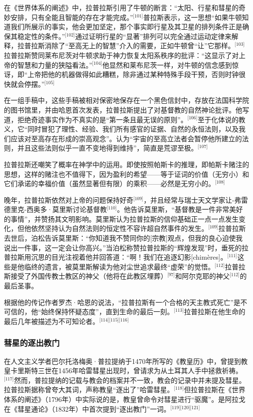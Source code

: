 在《世界体系的阐述》中，拉普拉斯引用了牛顿的断言：“太阳、行星和彗星的奇妙安排，只有全能且智能的存在才能完成。”\(^\text{[101]}\)普拉斯表示，这一思想“如果牛顿知道我们所展示的事实，他会更加坚定，那个事实即行星及其卫星的排列条件正是确保其稳定性的条件。”\(^\text{[102]}\)通过证明行星的“显著”排列可以完全通过运动定律来解释，拉普拉斯消除了“至高无上的智慧”介入的需要，正如牛顿曾“让”它那样。\(^\text{[103]}\)拉普拉斯赞同莱布尼茨对牛顿求助于神力恢复太阳系秩序的批评：“这显示了对上帝的智慧和力量的狭隘看法。”\(^\text{[104]}\)他显然和莱布尼茨一样，对牛顿的信念感到惊讶，即“上帝把他的机器做得如此糟糕，除非通过某种特殊手段干预，否则时钟很快就会停摆。”\(^\text{[105]}\)

在一组手稿中，这些手稿被相对保密地保存在一个黑色信封中，存放在法国科学院的图书馆里，并由哈恩首次发表，拉普拉斯提出了对基督教的自然神论批评。他写道，拒绝奇迹事实作为不真实的是“第一条且最无误的原则”。\(^\text{[106]}\)至于化体说的教义，它“同时冒犯了理性、经验、我们所有感官的证据、自然的永恒法则，以及我们应该对至高存在形成的崇高观念”。认为“宇宙的至高立法者会暂停他所建立的法则，并且这些法则似乎一直不变地得到维持”，简直是荒谬至极。\(^\text{[107]}\)

拉普拉斯还嘲笑了概率在神学中的运用。即使按照帕斯卡的推理，即帕斯卡赌注的思想，这样的赌注也不值得下，因为盈利的希望——等于证词的价值（无穷小）和它们承诺的幸福价值（虽然显著但有限）的乘积——必然是无穷小的。\(^\text{[108]}\)

晚年，拉普拉斯依然对上帝的问题保持好奇\(^\text{[109]}\)，并且经常与瑞士天文学家让-弗雷德里克-西奥多·莫里斯讨论基督教\(^\text{[110]}\)。他告诉莫里斯，“基督教是一件非常美好的事情”，并赞扬其文明影响。莫里斯认为拉普拉斯的信仰基础正一点一点发生变化，但他依然坚持认为自然法则的恒定性不容许超自然事件的发生。\(^\text{[109]}\)拉普拉斯去世后，泊松告诉莫里斯：“你知道我不赞同你的[宗教]观点，但我的良心迫使我说出一件事，这一定会让你高兴。”当泊松称赞拉普拉斯的“辉煌发现”时，垂死的拉普拉斯用沉思的目光注视着他并回答道：“啊！我们在追逐幻影[chimères]。\(^\text{[111]}\)这些是他临终的遗言，被莫里斯解读为他对尘世追求最终“虚荣”的觉悟。\(^\text{[112]}\)拉普拉斯接受了外国传教士教区的神父（他将在此教区埋葬）\(^\text{[97]}\)和阿尔克耶的神父\(^\text{[112]}\)的最后圣事。

根据他的传记作者罗杰·哈恩的说法，“拉普拉斯有一个合格的天主教式死亡”是不可信的，他“始终保持怀疑态度”，直到生命的最后一刻。\(^\text{[113]}\)拉普拉斯在他生命的最后几年被描述为不可知论者。\(^\text{[114][115][116]}\)
\subsubsection{彗星的逐出教门}  
在人文主义学者巴尔托洛梅奥·普拉提纳于1470年所写的《教皇历》中，曾提到教皇卡里斯特三世在1456年哈雷彗星出现时，曾请求为从土耳其人手中拯救祈祷。\(^\text{[117]}\)然而，普拉提纳的记载与教会的档案并不一致，教会的记录中并未提及彗星。拉普拉斯据称曾夸大其词，声称教皇“逐出了”哈雷彗星。\(^\text{[118]}\)但拉普拉斯在《世界体系的阐述》（1796年）中实际说的是，教皇曾命令对彗星进行“驱魔”。是阿拉戈在《彗星通论》（1832年）中首次提到“逐出教门”一词。\(^\text{[119][120][121]}\)
